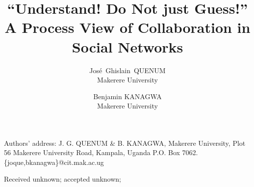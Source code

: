 \documentclass[acmjacm]{acmtrans2m}
\title{``Understand! Do Not just Guess!''\\ A Process View of Collaboration in Social Networks}
\author{ Jos\'{e}~Ghislain~QUENUM\\Makerere University \and Benjamin KANAGWA\\Makerere University}
\begin{document}
	
	\begin{bottomstuff}
	Authors' address: J. G. QUENUM \& B. KANAGWA, 
	Makerere University,
	Plot 56 Makerere University Road, Kampala, Uganda
	P.O. Box 7062.\newline
	\{joque,bkanagwa\}@cit.mak.ac.ug
	\end{bottomstuff}
	
\maketitle












\begin{received}
	Received unknown;
	accepted unknown;
\end{received}
\end{document}
